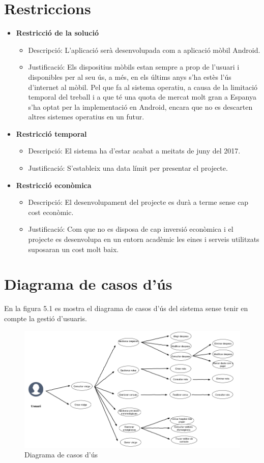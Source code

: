 \section{Restriccions}
\begin{itemize}
\item[]\textbf{Restricció de la solució}
\begin{itemize}
\item{}Descripció: L'aplicació serà desenvolupada com a aplicació mòbil Android.
\item{}Justificació: Els dispositius mòbils estan sempre a prop de l'usuari i
disponibles per al seu ús, a més, en els últims anys s'ha estès l'ús
d'internet al mòbil. Pel que fa al sistema operatiu, a causa de la limitació temporal del treball i a que té una quota de mercat molt gran a
Espanya s'ha optat per la implementació en Android, encara que no
es descarten altres sistemes operatius en un futur.
\end{itemize}
\item[]\textbf{Restricció temporal}
\begin{itemize}
\item{}Descripció: El sistema ha d'estar acabat a meitats de juny del 2017.
\item{}Justificació: S'estableix una data límit per presentar el projecte.
\end{itemize}
\item[]\textbf{Restricció econòmica}
\begin{itemize}
\item{}Descripció: El desenvolupament del projecte es durà a terme sense
cap cost econòmic.
\item{}Justificació: Com que no es disposa de cap inversió econòmica i el
projecte es desenvolupa en un entorn acadèmic les eines i serveis utilitzats suposaran un cost molt baix.
\end{itemize}
\end{itemize}

\section{Diagrama de casos d'ús}
En la figura 5.1 es mostra el diagrama de casos d'ús del sistema sense tenir en compte la gestió d'usuaris.

\begin{figure}[!h]
\centering
\includegraphics[scale=0.65]{Figures/casosUs.png}
\caption{Diagrama de casos d'ús}
\end{figure}

